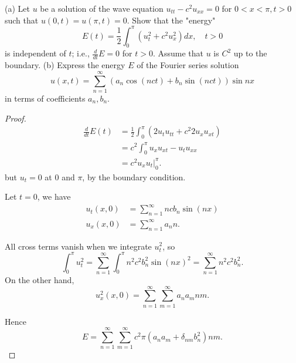 \begin{problem}
	(a) Let $u$ be a solution of the wave equation $u_{t t}-c^2 u_{x x}=0$ for $0<x<\pi, t>0$ such that $u(0, t)=u(\pi, t)=0$. Show that the "energy"
\[
E(t)=\frac{1}{2} \int_0^\pi\left(u_t^2+c^2 u_x^2\right) d x, \quad t>0
\]
is independent of $t$; i.e., $\frac{d}{d t} E=0$ for $t>0$. Assume that $u$ is $C^2$ up to the boundary.
(b) Express the energy $E$ of the Fourier series solution
\[
u(x, t)=\sum_{n=1}^{\infty}\left(a_n \cos (n c t)+b_n \sin (n c t)\right) \sin n x
\]
in terms of coefficients $a_n, b_n$.
\end{problem}
\begin{proof}
	\begin{align*}
		\frac{d}{dt} E(t)
		&= \frac{1}{2} \int _0^\pi \left( 2 u_t u_{t t} + c^2 2 u_x u_{x t} \right)  \\
		&= c^2 \int _0^\pi u_x u_{x t} - u_t u_{x x} \\
		&= c^2 u_x u_t |_0^\pi 
	.\end{align*}
	but $u_t = 0$ at $0$ and $\pi$, by the boundary condition.

	Let $t = 0$, we have
	\begin{align*}
		u_t(x,0) &= \sum_{n=1}^{\infty} n c b_n \sin(nx)\\
		u_x(x,0) &= \sum_{n=1}^{\infty} a_n n
	.\end{align*} 

	All cross terms vanish when we integrate $u_t^2$, so
	 \[
		\int _0^\pi u_t^2 = \sum_{n=1}^{\infty} \int _0^\pi n^2 c^2 b_n^2 \sin(nx)^2 = \sum_{n=1}^{\infty} n^2 c^2 b_n^2
	.\] 
	On the other hand,
	\[
		u_x^2(x,0) = \sum_{n=1}^{\infty} \sum_{m=1}^{\infty} a_n a_m n m
	.\] 

	Hence
	\[
		E = \sum_{n=1}^{\infty} \sum_{m=1}^{\infty} c^2 \pi (a_n a_m + \delta_{ n m } b_n^2) n m
	.\] 


\end{proof}


